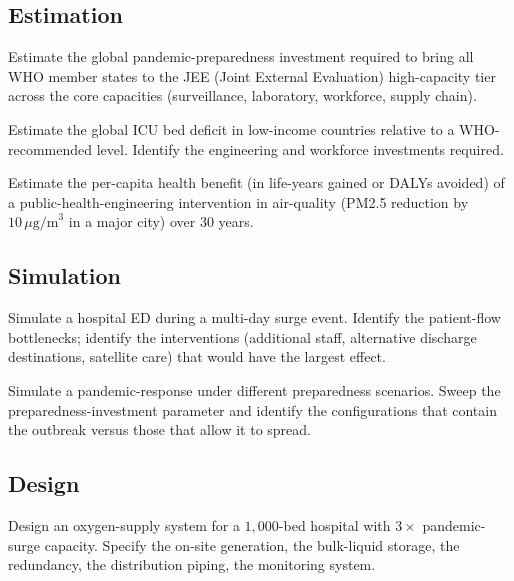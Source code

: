 \subsection*{Estimation}

\begin{exercise}
Estimate the global pandemic-preparedness investment required to bring all WHO member states to the JEE (Joint External Evaluation) high-capacity tier across the core capacities (surveillance, laboratory, workforce, supply chain).
\end{exercise}

\begin{exercise}
Estimate the global ICU bed deficit in low-income countries relative to a WHO-recommended level. Identify the engineering and workforce investments required.
\end{exercise}

\begin{exercise}
Estimate the per-capita health benefit (in life-years gained or DALYs avoided) of a public-health-engineering intervention in air-quality (PM2.5 reduction by $10\,\mu\text{g/m}^3$ in a major city) over $30$ years.
\end{exercise}

\subsection*{Simulation}

\begin{exercise}
Simulate a hospital ED during a multi-day surge event. Identify the patient-flow bottlenecks; identify the interventions (additional staff, alternative discharge destinations, satellite care) that would have the largest effect.
\end{exercise}

\begin{exercise}
Simulate a pandemic-response under different preparedness scenarios. Sweep the preparedness-investment parameter and identify the configurations that contain the outbreak versus those that allow it to spread.
\end{exercise}

\subsection*{Design}

\begin{exercise}
Design an oxygen-supply system for a $1{,}000$-bed hospital with $3\times$ pandemic-surge capacity. Specify the on-site generation, the bulk-liquid storage, the redundancy, the distribution piping, the monitoring system.
\end{exercise}

